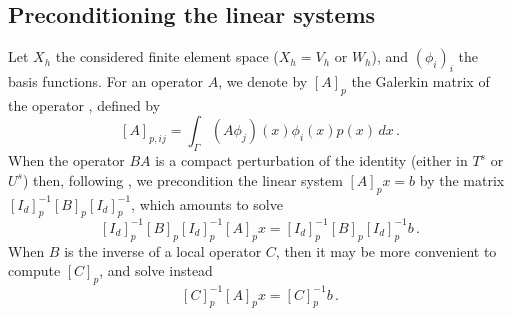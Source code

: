 \documentclass[a4paper]{subfiles}
\begin{document}
%
%
\subsection{Preconditioning the linear systems}
Let $X_h$ the considered finite element space ($X_h = V_h$ or $W_h$), and $(\phi_i)_{i}$ the basis functions. For an operator $A$, we denote by $\left[A\right]_p$ 
the Galerkin matrix of the operator , defined by
$$
[A]_{p,ij} = \int_\Gamma (A\phi_j)(x) \phi_i(x) p(x)\,dx\,.
$$
When the operator $BA$ is a compact perturbation of the identity (either in $T^s$ or $U^s$) then, following \cite{steinbach1998construction}, we 
precondition the linear system $\left[A\right]_p x = b$ by the matrix $\left[I_d\right]^{-1}_p \left[B\right]_p \left[I_d\right]_p^{-1}$, which amounts to solve
$$
\left[I_d\right]^{-1}_p \left[B\right]_p \left[I_d\right]_p^{-1} [A]_p x = \left[I_d\right]^{-1}_p \left[B\right]_p \left[I_d\right]_p^{-1} b\,.
$$
When $B$ is the inverse of a local operator $C$, then it may be more convenient to compute $\left[C\right]_p$, and solve instead
$$
\left[C\right]_p^{-1}[A]_p x = \left[C\right]_p^{-1}b\,.
$$
\end{document}
